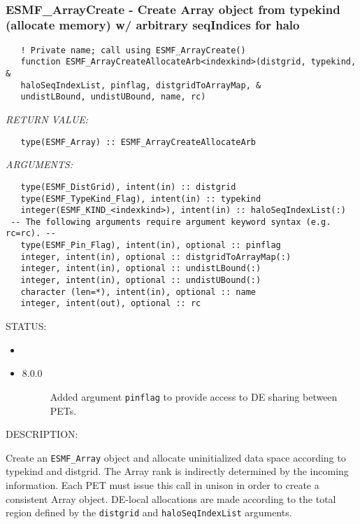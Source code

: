  
\mbox{}\hrulefill\ 
 
\subsubsection [ESMF\_ArrayCreate] {ESMF\_ArrayCreate - Create Array object from typekind (allocate memory) w/ arbitrary seqIndices for halo}


  
\begin{verbatim}   ! Private name; call using ESMF_ArrayCreate()
   function ESMF_ArrayCreateAllocateArb<indexkind>(distgrid, typekind, &
   haloSeqIndexList, pinflag, distgridToArrayMap, &
   undistLBound, undistUBound, name, rc)\end{verbatim}{\em RETURN VALUE:}
\begin{verbatim}   type(ESMF_Array) :: ESMF_ArrayCreateAllocateArb\end{verbatim}{\em ARGUMENTS:}
\begin{verbatim}   type(ESMF_DistGrid), intent(in) :: distgrid
   type(ESMF_TypeKind_Flag), intent(in) :: typekind
   integer(ESMF_KIND_<indexkind>), intent(in) :: haloSeqIndexList(:)
 -- The following arguments require argument keyword syntax (e.g. rc=rc). --
   type(ESMF_Pin_Flag), intent(in), optional :: pinflag
   integer, intent(in), optional :: distgridToArrayMap(:)
   integer, intent(in), optional :: undistLBound(:)
   integer, intent(in), optional :: undistUBound(:)
   character (len=*), intent(in), optional :: name
   integer, intent(out), optional :: rc\end{verbatim}
{\sf STATUS:}
   \begin{itemize}
   \item{}
   \item{}
   \begin{description}
   \item[8.0.0] Added argument {\tt pinflag} to provide access to DE sharing
   between PETs.
   \end{description}
   \end{itemize}
  
{\sf DESCRIPTION:\\ }


   Create an {\tt ESMF\_Array} object and allocate uninitialized data space
   according to typekind and distgrid. The Array rank is indirectly determined
   by the incoming information. Each PET must issue this call in unison in order
   to create a consistent Array object. DE-local allocations are made according
   to the total region defined by the {\tt distgrid} and {\tt haloSeqIndexList}
   arguments.
  
